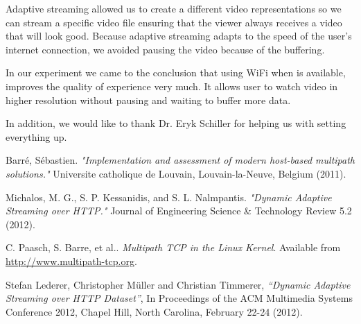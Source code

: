 \documentclass{llncs}
\begin{document}
Adaptive streaming allowed us to create a different video representations so we can stream a specific video file ensuring that the viewer always receives a video that will look good. Because adaptive streaming adapts to the speed of the user’s internet connection, we avoided pausing the video because of the buffering.

In our experiment we came to the conclusion that using WiFi when is available, improves the quality of experience very much. It allows user to watch video in higher resolution without pausing and waiting to buffer more data. 

In addition, we would like to thank Dr. Eryk Schiller for helping us with setting everything up. 



\begin{thebibliography}{1}
Barré, Sébastien. \emph{"Implementation and assessment of modern host-based multipath solutions." } Universite catholique de Louvain, Louvain-la-Neuve, Belgium (2011).

Michalos, M. G., S. P. Kessanidis, and S. L. Nalmpantis. \emph{"Dynamic Adaptive Streaming over HTTP."} Journal of Engineering Science \& Technology Review 5.2 (2012).

C. Paasch, S. Barre, et al.. \emph{Multipath TCP in the Linux Kernel}. Available from \url{http://www.multipath-tcp.org}.

Stefan Lederer, Christopher Müller and Christian Timmerer, \emph{“Dynamic Adaptive Streaming over HTTP Dataset”}, In Proceedings of the ACM Multimedia Systems Conference 2012, Chapel Hill, North Carolina, February 22-24 (2012). 


\end{thebibliography}
\end{document}
